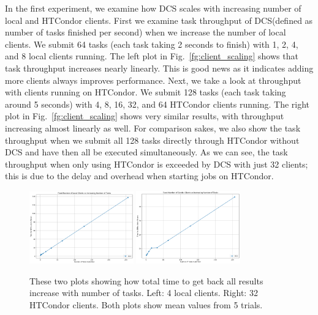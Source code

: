 \documentclass{article}
\begin{document}
In the first experiment, we examine how DCS scales with increasing number of local and HTCondor clients. First we examine task throughput of DCS(defined as number of tasks finished per second) when we increase the number of local clients. We submit 64 tasks (each task taking 2 seconds to finish) with 1, 2, 4, and 8 local clients running. The left plot in Fig.~\ref{fg:client_scaling} shows that task throughput increases nearly linearly. This is good news as it indicates adding more clients always improves performance. Next, we take a look at throughput with clients running on HTCondor. We submit 128 tasks (each task taking around 5 seconds) with 4, 8, 16, 32, and 64 HTCondor clients running. The right plot in Fig.~\ref{fg:client_scaling} shows very similar results, with throughput increasing almost linearly as well. For comparison sakes, we also show the task throughput when we submit all 128 tasks directly through HTCondor without DCS and have then all be executed simultaneously. As we can see, the task throughput when only using HTCondor is exceeded by DCS with just 32 clients; this is due to the delay and overhead when starting jobs on HTCondor.

\begin{figure}[t]
  \begin{center}
    \includegraphics[width=0.4\textwidth]{task_scaling_local.png}
    \includegraphics[width=0.4\textwidth]{task_scaling_condor.png}
    \caption{These two plots showing how total time to get back all results increase with number of tasks. Left: 4 local clients. Right: 32 HTCondor clients. Both plots show mean values from 5 trials.}
    \label{fg:task_scaling}
  \end{center}
\end{figure}
\end{document}
